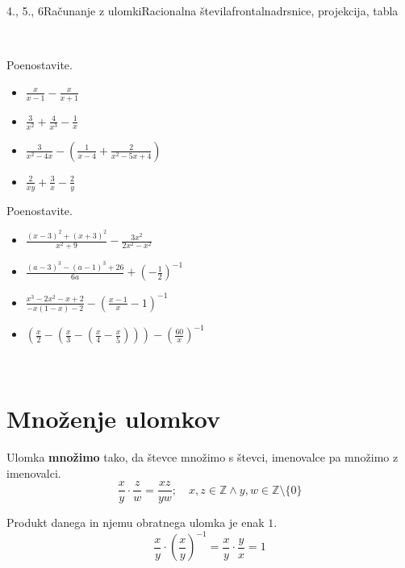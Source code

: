 \begin{priprava}{4., 5., 6}{}{Računanje z ulomki}{Racionalna števila}{frontalna}{drsnice, projekcija, tabla}
\begin{multicols}{2}
~

    \begin{naloga}
        Poenostavite.
        \begin{itemize}
            \item $\frac{x}{x-1}-\frac{x}{x+1}$ 
            \item $\frac{3}{x^2}+\frac{4}{x^3}-\frac{1}{x}$ 
            \item $\frac{3}{x^2-4x}-\left(\frac{1}{x-4}+\frac{2}{x^2-5x+4}\right)$ 
            \item $\frac{2}{xy}+\frac{3}{x}-\frac{2}{y}$ 
        \end{itemize}
    \end{naloga}




    \begin{naloga}
        Poenostavite.
        \begin{itemize}
            \item $\frac{(x-3)^2+(x+3)^2}{x^2+9}-\frac{3x^2}{2x^2-x^2}$ 
            \item $\frac{(a-3)^3-(a-1)^3+26}{6a}+\left(-\frac{1}{2}\right)^{-1}$ 
            \item $\frac{x^3-2x^2-x+2}{-x(1-x)-2}-\left(\frac{x-1}{x}-1\right)^{-1}$ 
            \item $\left(\frac{x}{2}-\left(\frac{x}{3}-\left(\frac{x}{4}-\frac{x}{5}\right)\right)\right)-\left(\frac{60}{x}\right)^{-1}$ 
        \end{itemize}
    \end{naloga}

\end{multicols}


    ~

\section{Množenje ulomkov}


        Ulomka \textbf{množimo} tako, da števce množimo s števci, imenovalce pa množimo z imenovalci.
        $$\dfrac{x}{y}\cdot \dfrac{z}{w}=\dfrac{xz}{yw}; \quad x,z\in\mathbb{Z}\land y,w\in\mathbb{Z}\setminus\{0\}$$
        
    
        Produkt danega in njemu obratnega ulomka je enak $1$.
        $$\dfrac{x}{y}\cdot\left(\dfrac{x}{y}\right)^{-1}=\dfrac{x}{y}\cdot\dfrac{y}{x}=1$$
    

    ~


\end{priprava}

